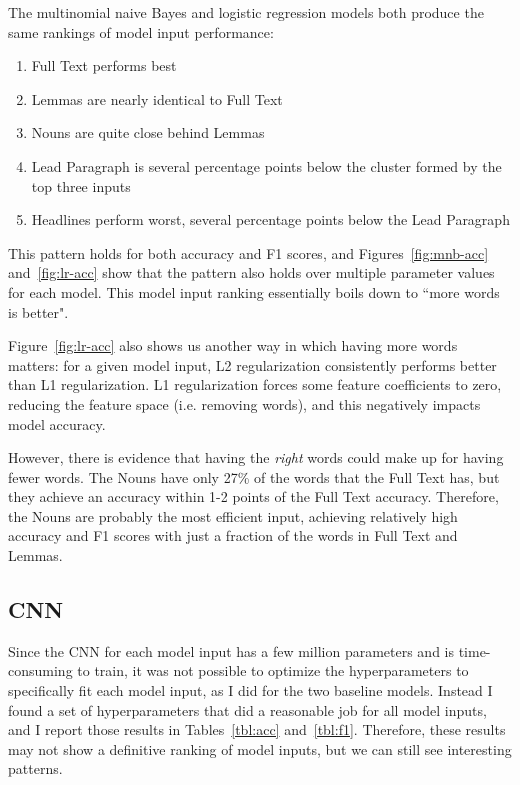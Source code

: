 \documentclass[11pt,a4paper,table]{article}
\begin{document}
The multinomial naive Bayes and logistic regression models both produce the same rankings of model input performance:

\begin{enumerate}
\item Full Text performs best
\item Lemmas are nearly identical to Full Text
\item Nouns are quite close behind Lemmas
\item Lead Paragraph is several percentage points below the cluster formed by the top three inputs
\item Headlines perform worst, several percentage points below the Lead Paragraph
\end{enumerate}

This pattern holds for both accuracy and F1 scores, and Figures~\ref{fig:mnb-acc} and~\ref{fig:lr-acc} show that the pattern also holds over multiple parameter values for each model. This model input ranking essentially boils down to ``more words is better".

Figure~\ref{fig:lr-acc} also shows us another way in which having more words matters: for a given model input, L2 regularization consistently performs better than L1 regularization. L1 regularization forces some feature coefficients to zero, reducing the feature space (i.e. removing words), and this negatively impacts model accuracy.

However, there is evidence that having the \textit{right} words could make up for having fewer words. The Nouns have only 27\% of the words that the Full Text has, but they achieve an accuracy within 1-2 points of the Full Text accuracy. Therefore, the Nouns are probably the most efficient input, achieving relatively high accuracy and F1 scores with just a fraction of the words in Full Text and Lemmas.

\subsection{CNN}
\label{ssec:cnn2}

Since the CNN for each model input has a few million parameters and is time-consuming to train, it was not possible to optimize the hyperparameters to specifically fit each model input, as I did for the two baseline models. Instead I found a set of hyperparameters that did a reasonable job for all model inputs, and I report those results in Tables~\ref{tbl:acc} and~\ref{tbl:f1}. Therefore, these results may not show a definitive ranking of model inputs, but we can still see interesting patterns.
\end{document}
